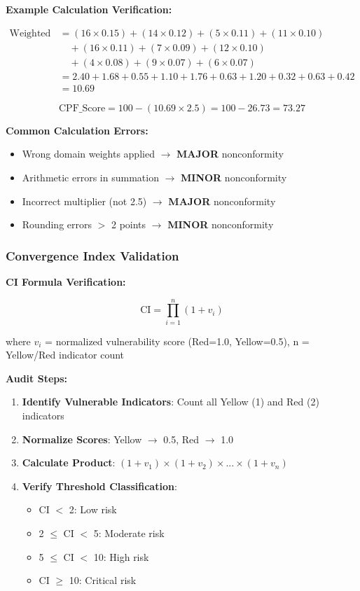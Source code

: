 \documentclass[11pt,a4paper]{article}
\begin{document}
\textbf{Example Calculation Verification:}

\begin{align*}
\text{Weighted Sum} &= (16 \times 0.15) + (14 \times 0.12) + (5 \times 0.11) + (11 \times 0.10) \\
&\quad + (16 \times 0.11) + (7 \times 0.09) + (12 \times 0.10) \\
&\quad + (4 \times 0.08) + (9 \times 0.07) + (6 \times 0.07) \\
&= 2.40 + 1.68 + 0.55 + 1.10 + 1.76 + 0.63 + 1.20 + 0.32 + 0.63 + 0.42 \\
&= 10.69
\end{align*}

\begin{equation}
\text{CPF\_Score} = 100 - (10.69 \times 2.5) = 100 - 26.73 = 73.27
\end{equation}

\textbf{Common Calculation Errors:}

\begin{itemize}
\item Wrong domain weights applied $\rightarrow$ \textbf{MAJOR} nonconformity
\item Arithmetic errors in summation $\rightarrow$ \textbf{MINOR} nonconformity
\item Incorrect multiplier (not 2.5) $\rightarrow$ \textbf{MAJOR} nonconformity
\item Rounding errors $>$ 2 points $\rightarrow$ \textbf{MINOR} nonconformity
\end{itemize}

\subsubsection{Convergence Index Validation}

\textbf{CI Formula Verification:}

\begin{equation}
\text{CI} = \prod_{i=1}^{n} (1 + v_i)
\end{equation}

where $v_i$ = normalized vulnerability score (Red=1.0, Yellow=0.5), n = Yellow/Red indicator count

\textbf{Audit Steps:}

\begin{enumerate}
\item \textbf{Identify Vulnerable Indicators}: Count all Yellow (1) and Red (2) indicators
\item \textbf{Normalize Scores}: Yellow $\rightarrow$ 0.5, Red $\rightarrow$ 1.0
\item \textbf{Calculate Product}: $(1 + v_1) \times (1 + v_2) \times ... \times (1 + v_n)$
\item \textbf{Verify Threshold Classification}:
  \begin{itemize}
  \item CI $<$ 2: Low risk
  \item 2 $\leq$ CI $<$ 5: Moderate risk
  \item 5 $\leq$ CI $<$ 10: High risk
  \item CI $\geq$ 10: Critical risk
  \end{itemize}
\end{enumerate}
\end{document}
